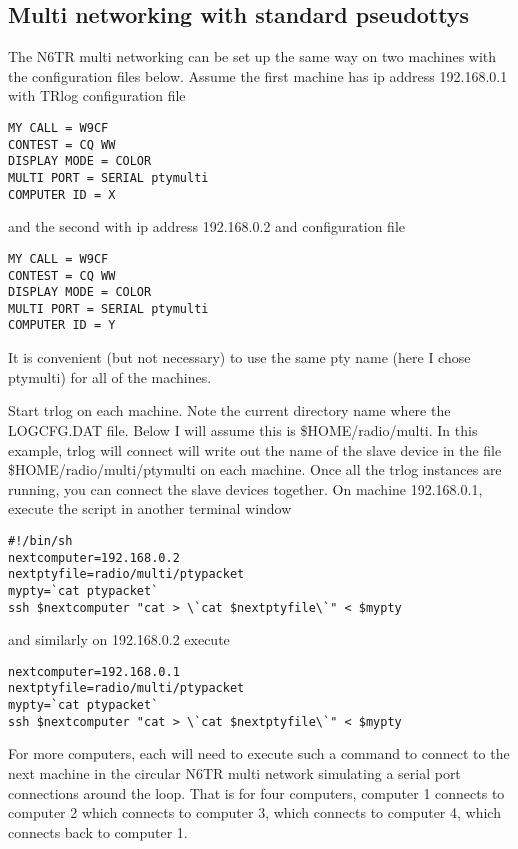 \documentclass[12pt]{article}
\begin{document}
\subsection{Multi networking with standard pseudottys}
The N6TR multi networking can be set up the same way on two machines
with the configuration files below. Assume the first machine has ip
address 192.168.0.1 with TRlog configuration file
\begin{verbatim}
MY CALL = W9CF
CONTEST = CQ WW
DISPLAY MODE = COLOR
MULTI PORT = SERIAL ptymulti
COMPUTER ID = X
\end{verbatim}
and the second with ip address 192.168.0.2 and configuration file
\begin{verbatim}
MY CALL = W9CF
CONTEST = CQ WW
DISPLAY MODE = COLOR
MULTI PORT = SERIAL ptymulti
COMPUTER ID = Y
\end{verbatim}
It is convenient (but not necessary)
to use the same pty name (here I chose ptymulti) for all
of the machines.

Start trlog on each machine. Note the current
directory name where the LOGCFG.DAT
file. Below I will assume this is \$HOME/radio/multi.
In this example,
trlog will connect will write out the name of the slave device
in the file \$HOME/radio/multi/ptymulti on each machine.
Once all the trlog instances are running, you can connect the
slave devices together.
On machine 192.168.0.1, execute the script in another terminal window
\begin{verbatim}
#!/bin/sh
nextcomputer=192.168.0.2
nextptyfile=radio/multi/ptypacket
mypty=`cat ptypacket`
ssh $nextcomputer "cat > \`cat $nextptyfile\`" < $mypty
\end{verbatim}
and similarly on 192.168.0.2 execute
\begin{verbatim}
nextcomputer=192.168.0.1
nextptyfile=radio/multi/ptypacket
mypty=`cat ptypacket`
ssh $nextcomputer "cat > \`cat $nextptyfile\`" < $mypty
\end{verbatim}
For more computers,
each will need to execute such a command to connect to the
next machine in the circular N6TR multi network simulating a serial
port connections around the loop. That is for four computers,
computer 1 connects to computer 2
which connects to computer 3, which connects to computer 4, which connects
back to computer 1.
\end{document}
